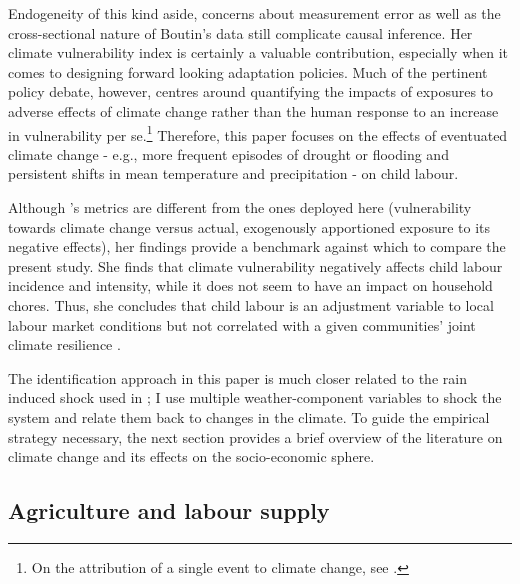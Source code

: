 \documentclass[a4paper,12pt]{article}
\theoremstyle{plain}
\theoremstyle{definition}
\theoremstyle{definition}
\theoremstyle{definition}
\theoremstyle{definition}
\begin{document}
Endogeneity of this kind aside, concerns about measurement error as well as the cross-sectional nature of Boutin's data still complicate causal inference. Her climate vulnerability index is certainly a valuable contribution, especially when it comes to designing forward looking adaptation policies. Much of the pertinent policy debate, however, centres around quantifying the impacts of exposures to adverse effects of climate change rather than the human response to an increase in vulnerability per se.\footnote{On the attribution of a single event to climate change, see \citet{Hansen2014}.} Therefore, this paper focuses on the effects of eventuated climate change - e.g., more frequent episodes of drought or flooding and persistent shifts in mean temperature and precipitation - on child labour.

Although \citeauthor{Boutin2014}'s metrics are different from the ones deployed here (vulnerability towards climate change versus actual, exogenously apportioned exposure to its negative effects), her findings provide a benchmark against which to compare the present study. She finds that climate vulnerability negatively affects child labour incidence and intensity, while it does not seem to have an impact on household chores. Thus, she concludes that child labour is an adjustment variable to local labour market conditions but not correlated with a given communities’ joint climate resilience \citep{Boutin2014}. 

The identification approach in this paper is much closer related to the rain induced shock used in \citet{Dumas2020}; I use multiple weather-component variables to shock the system and relate them back to changes in the climate. To guide the empirical strategy necessary, the next section provides a brief overview of the literature on climate change and its effects on the socio-economic sphere. 

\subsection{Agriculture and labour supply}
\label{sub:agriculture_and_labour_supply}
\end{document}
